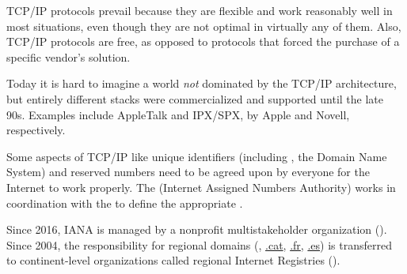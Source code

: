 TCP/IP protocols prevail because they are flexible and work reasonably well in most situations, 
even though they are not optimal in virtually any of them. 
Also, TCP/IP protocols are free, as opposed to  protocols
that forced the purchase of a specific vendor's solution.
% 
\begin{remark}
Today it is hard to imagine a world \textit{not} 
dominated by the TCP/IP architecture, 
but entirely different stacks were commercialized and supported until the late 90s.
Examples include AppleTalk and IPX/SPX, by Apple and Novell, respectively.
\end{remark}


Some aspects of TCP/IP like unique identifiers 
(including , the Domain Name System)
and reserved numbers need to be agreed upon by everyone for the Internet to work properly.
% 
The  (Internet Assigned Numbers Authority) works in coordination with the 
to define the appropriate .

\begin{remark}
Since 2016, IANA is managed by a nonprofit multistakeholder organization 
().
% 
Since 2004, the responsibility for regional domains 
(\eg, \url{.cat}, \url{.fr}, \url{.es}) is transferred to continent-level 
organizations called regional Internet Registries ().
\end{remark}









